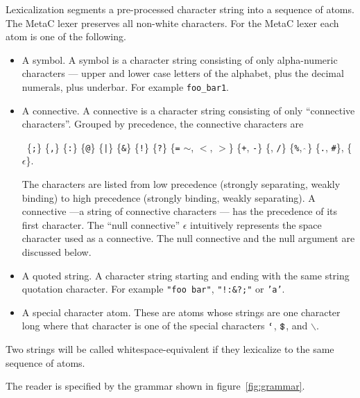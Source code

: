 \documentclass{article}
\newcommand{\mtt}[1]{\mbox{\tt #1}}
\begin{document}
Lexicalization segments a pre-processed character string into a sequence of atoms.
The MetaC lexer preserves all non-white characters.  For the MetaC lexer each atom is one of the following.

\begin{itemize}
\item A symbol.  A symbol is a character string consisting of only alpha-numeric characters --- upper and lower case letters of the alphabet, plus the decimal numerals, plus underbar.
  For example {\tt foo\_bar1}.
\item A connective.  A connective is a character string consisting of only ``connective characters''.
  Grouped by precedence, the connective characters are
  
  \medskip
  {\small
  \centerline{~\;\;\;\;\;\;\{\mtt{;}\} \{\mtt{,}\} \{\mtt{:}\} \{\mtt{@}\}
  \{{\tt |}\} \{{\tt \&}\} \{{\tt !}\} \{{\tt ?}\} \{{\tt =} {\tt $\sim$}, {\tt $<$}, {\tt $>$}\} \{{\tt +}, {\tt -}\}
  \{{\tt *}, {\tt /}\} \{{\tt \%}, $\hat{~}$\} \{{\tt .}, {\tt \#}\}, \{$\epsilon$\}.}
  }
  \medskip
  The characters are listed from low precedence (strongly separating, weakly binding) to high precedence (strongly binding, weakly separating). A connective
  ---a string of connective characters --- has the precedence of its first character.  The ``null connective'' $\epsilon$
  intuitively represents the space character used as a connective.  The null connective and the null argument are discussed below.
\item A quoted string.  A character string starting and ending with the same string quotation character.  For example {\tt "foo bar"}, {\tt "!:\&?;"} or {\tt 'a'}.
\item A special character atom. These are atoms whose strings are one character long where that character is one of
  the special characters $\mtt{`}$, $\mtt{\$}$, and $\backslash$.
\end{itemize}

Two strings will be called whitespace-equivalent if they lexicalize to the same sequence of atoms.

\newcommand{\sym}{\mathrm{SYM}}
\newcommand{\conn}{\mathrm{CONN}}
\newcommand{\quot}{\mathrm{QUOTE}}
\newcommand{\misc}{\mathrm{MISC}}
\newcommand{\app}{\mathrm{APP}}
\newcommand{\var}{\mathrm{VAR}}


The reader is specified by the grammar shown in figure~\ref{fig:grammar}.
\end{document}
